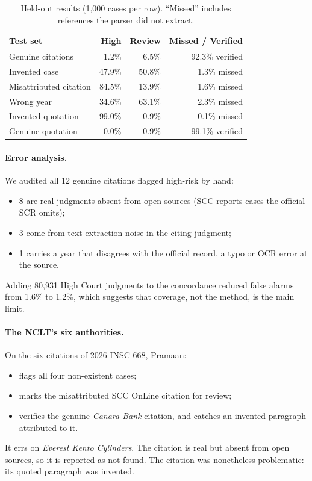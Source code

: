 \documentclass[sigconf,nonacm]{acmart}
\newcommand{\genHigh}{1.2\%}
\newcommand{\genReview}{6.5\%}
\newcommand{\genOk}{92.3\%}
\newcommand{\fakeCaseHigh}{47.9\%}\newcommand{\fakeCaseRev}{50.8\%}\newcommand{\fakeCaseMiss}{1.3\%}
\newcommand{\wrongCiteHigh}{84.5\%}\newcommand{\wrongCiteRev}{13.9\%}\newcommand{\wrongCiteMiss}{1.6\%}
\newcommand{\wrongYearHigh}{34.6\%}\newcommand{\wrongYearRev}{63.1\%}\newcommand{\wrongYearMiss}{2.3\%}
\newcommand{\fakeQuoteHigh}{99.0\%}\newcommand{\fakeQuoteRev}{0.9\%}\newcommand{\fakeQuoteMiss}{0.1\%}
\newcommand{\realQuoteHigh}{0.0\%}\newcommand{\realQuoteRev}{0.9\%}\newcommand{\realQuoteOk}{99.1\%}
\begin{document}
\begin{table}[t]
\caption{Held-out results (1,000 cases per row). ``Missed'' includes references the parser did not
extract.}
\label{tab:results}
\begin{tabular}{lrrr}
\toprule
Test set & High & Review & Missed / Verified \\
\midrule
Genuine citations & \genHigh & \genReview & \genOk{} verified \\
Invented case & \fakeCaseHigh & \fakeCaseRev & \fakeCaseMiss{} missed \\
Misattributed citation & \wrongCiteHigh & \wrongCiteRev & \wrongCiteMiss{} missed \\
Wrong year & \wrongYearHigh & \wrongYearRev & \wrongYearMiss{} missed \\
Invented quotation & \fakeQuoteHigh & \fakeQuoteRev & \fakeQuoteMiss{} missed \\
Genuine quotation & \realQuoteHigh & \realQuoteRev & \realQuoteOk{} verified \\
\bottomrule
\end{tabular}
\end{table}

\paragraph{Error analysis.}
We audited all 12 genuine citations flagged high-risk by hand:
\begin{itemize}
\item 8 are real judgments absent from open sources (SCC reports cases the official SCR omits);
\item 3 come from text-extraction noise in the citing judgment;
\item 1 carries a year that disagrees with the official record, a typo or OCR error at the source.
\end{itemize}
Adding 80{,}931 High Court judgments to the concordance reduced false alarms from 1.6\% to 1.2\%,
which suggests that coverage, not the method, is the main limit.

\paragraph{The NCLT's six authorities.}
On the six citations of 2026 INSC 668, Pramaan:
\begin{itemize}
\item flags all four non-existent cases;
\item marks the misattributed SCC OnLine citation for review;
\item verifies the genuine \emph{Canara Bank} citation, and catches an invented paragraph attributed
to it.
\end{itemize}
It errs on \emph{Everest Kento Cylinders}. The citation is real but absent from open sources, so it
is reported as not found. The citation was nonetheless problematic: its quoted paragraph was invented.
\end{document}
